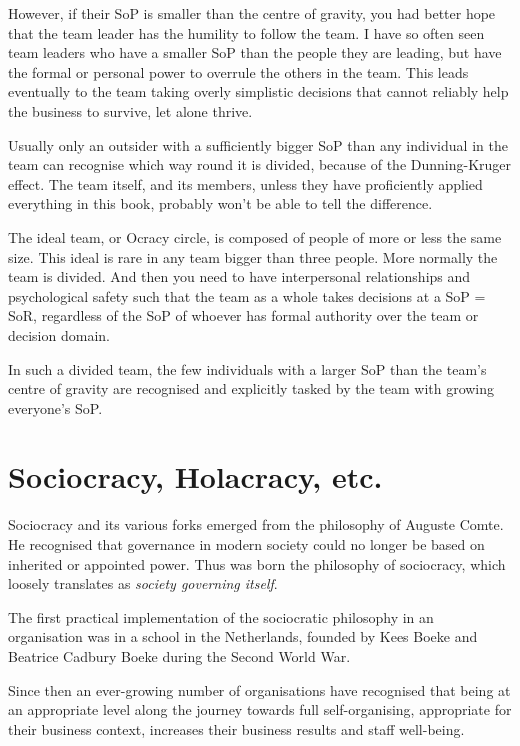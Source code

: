 However, if their SoP is smaller than the centre of gravity, you had better hope that the team leader has the humility to follow the team. I have so often seen team leaders who have a smaller SoP than the people they are leading, but have the formal or personal power to overrule the others in the team. This leads eventually to the team taking overly simplistic decisions that cannot reliably help the business to survive, let alone thrive.


Usually only an outsider with a sufficiently bigger SoP than any individual in the team can recognise which way round it is divided, because of the Dunning-Kruger effect.  The team itself, and its members, unless they have proficiently applied everything in this book, probably won’t be able to tell the difference.


The ideal team, or Ocracy circle, is composed of people of more or less the same size. This ideal is rare in any team bigger than three people. More normally the team is divided. And then you need to have interpersonal relationships and psychological safety such that the team as a whole takes decisions at a SoP = SoR, regardless of the SoP  of whoever has formal authority over the team or decision domain.


In such a divided team, the few individuals with a larger SoP than the team's centre of gravity are recognised and explicitly tasked by the team with growing everyone's SoP.


\section{Sociocracy, Holacracy, etc.}
Sociocracy and its various forks emerged from the philosophy of Auguste Comte.  He recognised that governance in modern society could no longer be based on inherited or appointed power. Thus was born the philosophy of sociocracy, which loosely translates as \emph{society governing itself}.


The first practical implementation of the sociocratic philosophy in an organisation was in a school in the Netherlands, founded by Kees Boeke and Beatrice Cadbury Boeke during the Second World War. 


Since then an ever-growing number of organisations have recognised that being at an appropriate level along the journey towards full self-organising, appropriate for their business context, increases their business results and staff well-being.


